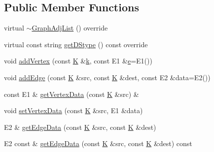 \subsection*{Public Member Functions}
\begin{DoxyCompactItemize}
\item 
virtual \mbox{\hyperlink{classbridges_1_1_graph_adj_list_af7acceab0f85c75de56cf2fc74b3690b}{$\sim$\+Graph\+Adj\+List}} () override
\item 
virtual const string \mbox{\hyperlink{classbridges_1_1_graph_adj_list_ab1aeeed39ac0e0f66a677e7b0e722030}{get\+D\+Stype}} () const override
\item 
void \mbox{\hyperlink{classbridges_1_1_graph_adj_list_a55565a4aff573c6a7751d7845cdfd5f2}{add\+Vertex}} (const \mbox{\hyperlink{namespacebridges_acfb0a4f7877d8f63de3e6862004c50edaa5f3c6a11b03839d46af9fb43c97c188}{K}} \&\mbox{\hyperlink{namespacebridges_acfb0a4f7877d8f63de3e6862004c50eda8ce4b16b22b58894aa86c421e8759df3}{k}}, const E1 \&\mbox{\hyperlink{namespacebridges_acfb0a4f7877d8f63de3e6862004c50edae1671797c52e15f763380b45e841ec32}{e}}=E1())
\item 
void \mbox{\hyperlink{classbridges_1_1_graph_adj_list_a86ea5d1bed0d88e2636b0e22e08686a9}{add\+Edge}} (const \mbox{\hyperlink{namespacebridges_acfb0a4f7877d8f63de3e6862004c50edaa5f3c6a11b03839d46af9fb43c97c188}{K}} \&src, const \mbox{\hyperlink{namespacebridges_acfb0a4f7877d8f63de3e6862004c50edaa5f3c6a11b03839d46af9fb43c97c188}{K}} \&dest, const E2 \&data=E2())
\item 
const E1 \& \mbox{\hyperlink{classbridges_1_1_graph_adj_list_a38ab30a0990187275d32e0590e150aaf}{get\+Vertex\+Data}} (const \mbox{\hyperlink{namespacebridges_acfb0a4f7877d8f63de3e6862004c50edaa5f3c6a11b03839d46af9fb43c97c188}{K}} \&src) \&
\item 
void \mbox{\hyperlink{classbridges_1_1_graph_adj_list_aa30a944a429e0422cbe0ddd7bdbd353b}{set\+Vertex\+Data}} (const \mbox{\hyperlink{namespacebridges_acfb0a4f7877d8f63de3e6862004c50edaa5f3c6a11b03839d46af9fb43c97c188}{K}} \&src, E1 \&data)
\item 
E2 \& \mbox{\hyperlink{classbridges_1_1_graph_adj_list_a3e4b21d0ff4b277502b2bb10e57df3c7}{get\+Edge\+Data}} (const \mbox{\hyperlink{namespacebridges_acfb0a4f7877d8f63de3e6862004c50edaa5f3c6a11b03839d46af9fb43c97c188}{K}} \&src, const \mbox{\hyperlink{namespacebridges_acfb0a4f7877d8f63de3e6862004c50edaa5f3c6a11b03839d46af9fb43c97c188}{K}} \&dest)
\item 
E2 const  \& \mbox{\hyperlink{classbridges_1_1_graph_adj_list_af1a762dd4bdc60cf80251df173f2a683}{get\+Edge\+Data}} (const \mbox{\hyperlink{namespacebridges_acfb0a4f7877d8f63de3e6862004c50edaa5f3c6a11b03839d46af9fb43c97c188}{K}} \&src, const \mbox{\hyperlink{namespacebridges_acfb0a4f7877d8f63de3e6862004c50edaa5f3c6a11b03839d46af9fb43c97c188}{K}} \&dest) const

\end{DoxyCompactItemize}
